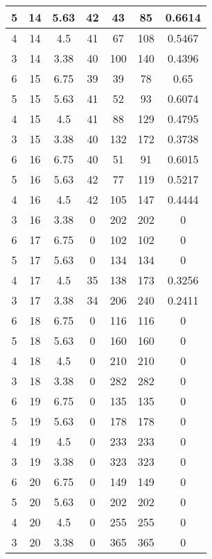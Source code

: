 \documentclass[letterpaper, 12pt]{article}
\begin{document}
\begin{longtable}{|c|c|c|c|c|c|c|}
\hline
5 & 14 & 5.63 & 42 & 43 & 85 & 0.6614 \\
\hline
4 & 14 & 4.5 & 41 & 67 & 108 & 0.5467 \\
\hline
3 & 14 & 3.38 & 40 & 100 & 140 & 0.4396 \\
\hline
6 & 15 & 6.75 & 39 & 39 & 78 & 0.65 \\
\hline
5 & 15 & 5.63 & 41 & 52 & 93 & 0.6074 \\
\hline
4 & 15 & 4.5 & 41 & 88 & 129 & 0.4795 \\
\hline
3 & 15 & 3.38 & 40 & 132 & 172 & 0.3738 \\
\hline
6 & 16 & 6.75 & 40 & 51 & 91 & 0.6015 \\
\hline
5 & 16 & 5.63 & 42 & 77 & 119 & 0.5217 \\
\hline
4 & 16 & 4.5 & 42 & 105 & 147 & 0.4444 \\
\hline
3 & 16 & 3.38 & 0 & 202 & 202 & 0 \\
\hline
6 & 17 & 6.75 & 0 & 102 & 102 & 0 \\
\hline
5 & 17 & 5.63 & 0 & 134 & 134 & 0 \\
\hline
4 & 17 & 4.5 & 35 & 138 & 173 & 0.3256 \\
\hline
3 & 17 & 3.38 & 34 & 206 & 240 & 0.2411 \\
\hline
6 & 18 & 6.75 & 0 & 116 & 116 & 0 \\
\hline
5 & 18 & 5.63 & 0 & 160 & 160 & 0 \\
\hline
4 & 18 & 4.5 & 0 & 210 & 210 & 0 \\
\hline
3 & 18 & 3.38 & 0 & 282 & 282 & 0 \\
\hline
6 & 19 & 6.75 & 0 & 135 & 135 & 0 \\
\hline
5 & 19 & 5.63 & 0 & 178 & 178 & 0 \\
\hline
4 & 19 & 4.5 & 0 & 233 & 233 & 0 \\
\hline
3 & 19 & 3.38 & 0 & 323 & 323 & 0 \\
\hline
6 & 20 & 6.75 & 0 & 149 & 149 & 0 \\
\hline
5 & 20 & 5.63 & 0 & 202 & 202 & 0 \\
\hline
4 & 20 & 4.5 & 0 & 255 & 255 & 0 \\
\hline
3 & 20 & 3.38 & 0 & 365 & 365 & 0 \\
\hline
\end{longtable}
\end{document}

